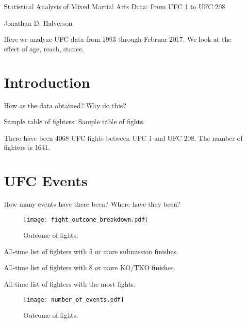 \documentclass[10pt]{article}
\begin{document}
Statistical Analysis of Mixed Martial Arts Data: From UFC 1 to UFC 208

Jonathan D. Halverson

Here we analyze UFC data from 1993 through Februar 2017. We look at the effect
of age, reach, stance.

\section{Introduction}

How as the data obtained? Why do this?

Sample table of fighters.
Sample table of fights.

There have been 4068 UFC fights between UFC 1 and UFC 208. The number of fighters is 1641.

\section{UFC Events}

How many events have there been? Where have they been?

\begin{figure}[h]
\begin{center}
\texttt{[image: fight\_outcome\_breakdown.pdf]}
\caption{Outcome of fights.}
\end{center}
\end{figure}

\begin{center}
\begin{table}[h]

\caption{All-time list of fighters with 5 or more submission finishes.}
\end{table}
\end{center}

\begin{center}
\begin{table}[h]

\caption{All-time list of fighters with 8 or more KO/TKO finishes.}
\end{table}
\end{center}

\begin{center}
\begin{table}[h]

\caption{All-time list of fighters with the most fights.}
\end{table}
\end{center}


\begin{figure}[h]
\begin{center}
\texttt{[image: number\_of\_events.pdf]}
\caption{Outcome of fights.}
\end{center}
\end{figure}
\end{document}
